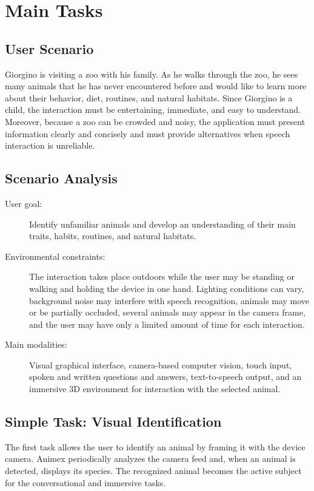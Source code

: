 \documentclass{article}
\begin{document}
\section{Main Tasks}

\subsection{User Scenario}
Giorgino is visiting a zoo with his family. As he walks through the zoo, he sees many animals that he has never encountered before and would like to learn more about their behavior, diet, routines, and natural habitats. Since Giorgino is a child, the interaction must be entertaining, immediate, and easy to understand. Moreover, because a zoo can be crowded and noisy, the application must present information clearly and concisely and must provide alternatives when speech interaction is unreliable.

\subsection{Scenario Analysis}
\begin{description}
    \item[User goal:] Identify unfamiliar animals and develop an understanding of their main traits, habits, routines, and natural habitats.
    \item[Environmental constraints:] The interaction takes place outdoors while the user may be standing or walking and holding the device in one hand. Lighting conditions can vary, background noise may interfere with speech recognition, animals may move or be partially occluded, several animals may appear in the camera frame, and the user may have only a limited amount of time for each interaction.
    \item[Main modalities:] Visual graphical interface, camera-based computer vision, touch input, spoken and written questions and answers, text-to-speech output, and an immersive 3D environment for interaction with the selected animal.
\end{description}

\subsection{Simple Task: Visual Identification}
The first task allows the user to identify an animal by framing it with the device camera. Animex periodically analyzes the camera feed and, when an animal is detected, displays its species. The recognized animal becomes the active subject for the conversational and immersive tasks.
\end{document}
